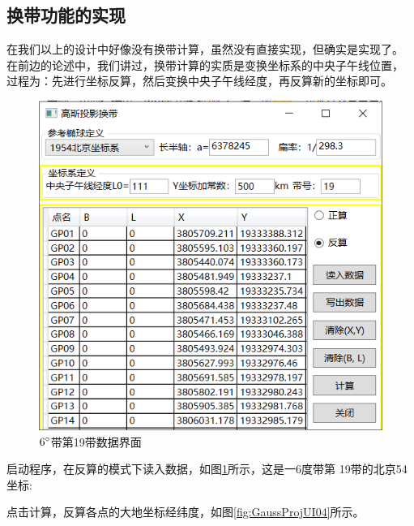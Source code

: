 \subsection{换带功能的实现}

在我们以上的设计中好像没有换带计算，虽然没有直接实现，但确实是实现了。
在前边的论述中，我们讲过，换带计算的实质是变换坐标系的中央子午线位置，
过程为：先进行坐标反算，然后变换中央子午线经度，再反算新的坐标即可。

\begin{figure}[htbp]
    \centering
    \includegraphics[scale=0.8]{chapter/gaussProj/UI03.png}
    \caption{$6^\circ$带第19带数据界面}
    \label{fig:GaussProjUI03}
\end{figure}

启动程序，在反算的模式下读入数据，如图\ref{fig:GaussProjUI03}所示，这是一6度带第
19带的北京54坐标:

点击计算，反算各点的大地坐标经纬度，如图\ref{fig:GaussProjUI04}所示。


